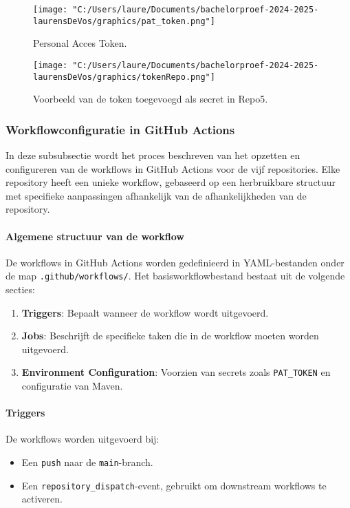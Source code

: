 \begin{figure}[h!]
    \centering
    \texttt{[image: "C:/Users/laure/Documents/bachelorproef-2024-2025-laurensDeVos/graphics/pat\_token.png"]}
    \caption{Personal Acces Token.}
    \label{fig:PATTOKEN}
\end{figure}

\begin{figure}[h!]
    \centering
    \texttt{[image: "C:/Users/laure/Documents/bachelorproef-2024-2025-laurensDeVos/graphics/tokenRepo.png"]}
    \caption{Voorbeeld van de token toegevoegd als secret in Repo5.}
    \label{fig:tokenRepo}
\end{figure}

\subsubsection{Workflowconfiguratie in GitHub Actions}

In deze subsubsectie wordt het proces beschreven van het opzetten en configureren van de workflows in GitHub Actions voor de vijf repositories. Elke repository heeft een unieke workflow, gebaseerd op een herbruikbare structuur met specifieke aanpassingen afhankelijk van de afhankelijkheden van de repository.

\paragraph{Algemene structuur van de workflow}
De workflows in GitHub Actions worden gedefinieerd in YAML-bestanden onder de map \texttt{.github/workflows/}. Het basisworkflowbestand bestaat uit de volgende secties:
\begin{enumerate}
    \item \textbf{Triggers}: Bepaalt wanneer de workflow wordt uitgevoerd.
    \item \textbf{Jobs}: Beschrijft de specifieke taken die in de workflow moeten worden uitgevoerd.
    \item \textbf{Environment Configuration}: Voorzien van secrets zoals \texttt{PAT\_TOKEN} en configuratie van Maven.
\end{enumerate}

\paragraph{Triggers}
De workflows worden uitgevoerd bij:
\begin{itemize}
    \item Een \texttt{push} naar de \texttt{main}-branch.
    \item Een \texttt{repository\_dispatch}-event, gebruikt om downstream workflows te activeren.
\end{itemize}

